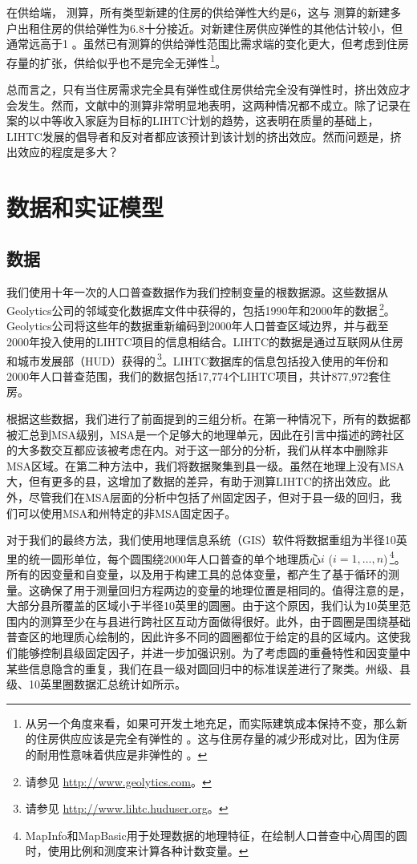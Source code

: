 \documentclass[lang=cn,11pt,a4paper]{paper}
\begin{document}
在供给端，\cite{Mayer200085} 测算，所有类型新建的住房的供给弹性大约是6，这与 \cite{DiPasquale1992337} 测算的新建多户出租住房的供给弹性为6.8十分接近。对新建住房供应弹性的其他估计较小，但通常远高于1 \citep{DiPasquale1992337,Rosen19791}。虽然已有测算的供给弹性范围比需求端的变化更大，但考虑到住房存量的扩张，供给似乎也不是完全无弹性\,\footnote{从另一个角度来看，如果可开发土地充足，而实际建筑成本保持不变，那么新的住房供应应该是完全有弹性的 \citep{Rosenthal1994182}。这与住房存量的减少形成对比，因为住房的耐用性意味着供应是非弹性的 \citep{Glaeser2005345}。}。

总而言之，只有当住房需求完全具有弹性或住房供给完全没有弹性时，挤出效应才会发生。然而，文献中的测算非常明显地表明，这两种情况都不成立。除了记录在案的以中等收入家庭为目标的LIHTC计划的趋势，这表明在质量的基础上，LIHTC发展的倡导者和反对者都应该预计到该计划的挤出效应。然而问题是，挤出效应的程度是多大？

\section{数据和实证模型}\label{sec4}

\subsection{数据}

我们使用十年一次的人口普查数据作为我们控制变量的根数据源。这些数据从Geolytics公司的邻域变化数据库文件中获得的，包括1990年和2000年的数据\,\footnote{请参见 \url{http://www.geolytics.com}。}。Geolytics公司将这些年的数据重新编码到2000年人口普查区域边界，并与截至2000年投入使用的LIHTC项目的信息相结合。LIHTC的数据是通过互联网从住房和城市发展部（HUD）获得的\,\footnote{请参见 \url{http://www.lihtc.huduser.org}。}。LIHTC数据库的信息包括投入使用的年份和2000年人口普查范围，我们的数据包括17,774个LIHTC项目，共计877,972套住房。

根据这些数据，我们进行了前面提到的三组分析。在第一种情况下，所有的数据都被汇总到MSA级别，MSA是一个足够大的地理单元，因此在引言中描述的跨社区的大多数交互都应该被考虑在内。对于这一部分的分析，我们从样本中删除非MSA区域。在第二种方法中，我们将数据聚集到县一级。虽然在地理上没有MSA大，但有更多的县，这增加了数据的差异，有助于测算LIHTC的挤出效应。此外，尽管我们在MSA层面的分析中包括了州固定因子，但对于县一级的回归，我们可以使用MSA和州特定的非MSA固定因子。

对于我们的最终方法，我们使用地理信息系统（GIS）软件将数据重组为半径10英里的统一圆形单位，每个圆围绕2000年人口普查的单个地理质心$i$ ($i = 1, \dots,n$)\,\footnote{MapInfo和MapBasic用于处理数据的地理特征，在绘制人口普查中心周围的圆时，使用比例和测度来计算各种计数变量。}。所有的因变量和自变量，以及用于构建工具的总体变量，都产生了基于循环的测量。这确保了用于测量回归方程两边的变量的地理位置是相同的。值得注意的是，大部分县所覆盖的区域小于半径10英里的圆圈。由于这个原因，我们认为10英里范围内的测算至少在与县进行跨社区互动方面做得很好。此外，由于圆圈是围绕基础普查区的地理质心绘制的，因此许多不同的圆圈都位于给定的县的区域内。这使我们能够控制县级固定因子，并进一步加强识别。为了考虑圆的重叠特性和因变量中某些信息隐含的重复，我们在县一级对圆回归中的标准误差进行了聚类。州级、县级、10英里圈数据汇总统计如所示。
\end{document}

